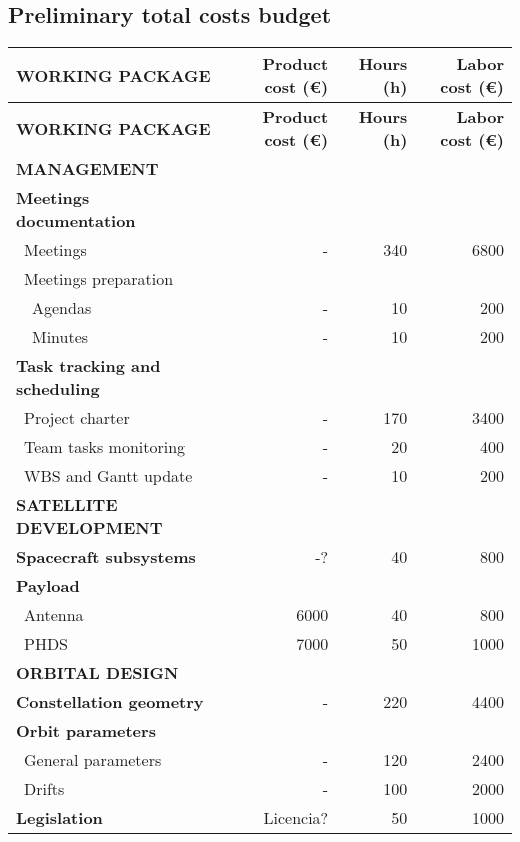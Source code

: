 \documentclass[11pt,a4paper]{article}
\begin{document}
\pagebreak

\subsection{Preliminary total costs budget}
\begin{longtable}{| l | r | r |r | }
	\hline
\rowcolor[gray]{0.65}	\textbf{WORKING PACKAGE} &\textbf{Product cost (\euro)}& \textbf{Hours (h)}     &  \textbf{Labor cost (\euro)}   \\
    \hline
    \endfirsthead

	\hline
\rowcolor[gray]{0.65}	\textbf{WORKING PACKAGE} &\textbf{Product cost (\euro)}& \textbf{Hours (h)}     &  \textbf{Labor cost (\euro)}   \\
    \hline
    \endhead

\rowcolor[gray]{0.85} \textbf{MANAGEMENT} & &  &  \\

   \textbf{Meetings documentation} & & & \\
	   \blue ~Meetings & - & 340  & 6800  \\
	   \blue ~Meetings preparation & & &   \\
	   ~~Agendas & - & 10 & 200 \\
	   ~~Minutes & - & 10 & 200 \\
	\hline
	\textbf{Task tracking and scheduling} & & & \\
	   \blue ~Project charter & - & 170 & 3400  \\
	   \blue ~Team tasks monitoring & - & 20 & 400  \\
	   \blue ~WBS and Gantt update & - & 10 & 200 \\

\rowcolor[gray]{0.85}	\textbf{SATELLITE DEVELOPMENT} & &  &   \\
	
	\textbf{Spacecraft subsystems} & -? & 40 & 800  \\
	\hline
	\textbf{Payload} & & &  \\
	   \blue ~Antenna & 6000 & 40  & 800  \\
	   \blue ~PHDS & 7000 & 50  & 1000  \\

\rowcolor[gray]{0.85}	\textbf{ORBITAL DESIGN} & &  & \\

	\textbf{Constellation geometry} & - & 220  & 4400  \\
	\hline
	\textbf{Orbit parameters} & &   &  \\
	   \blue ~General parameters & - & 120 & 2400 \\
	   \blue ~Drifts & - & 100  & 2000  \\
	\hline
	\textbf{Legislation} & Licencia? & 50 & 1000 \\
   

\end{longtable}
\end{document}
